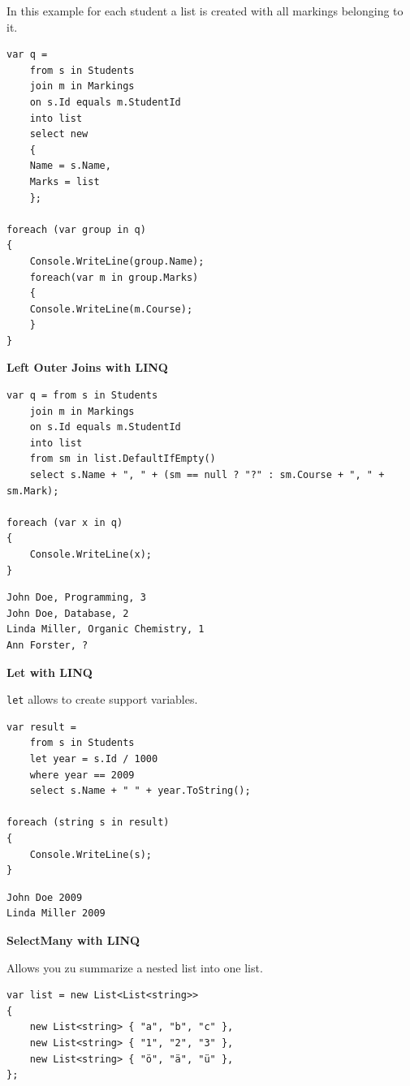 \documentclass[11pt,twoside,landscape]{article}
\begin{document}
\begin{multicols}{3}
In this example for each student a list is created with all markings belonging to it.
\lstset{language=csharp,label= ,caption= ,captionpos=b,numbers=none}
\begin{lstlisting}
var q =
    from s in Students
    join m in Markings
    on s.Id equals m.StudentId
    into list
    select new
    {
	Name = s.Name,
	Marks = list
    };

foreach (var group in q)
{
    Console.WriteLine(group.Name);
    foreach(var m in group.Marks)
    {
	Console.WriteLine(m.Course);
    }
}
\end{lstlisting}

\textbf{Left Outer Joins with LINQ}

\lstset{language=csharp,label= ,caption= ,captionpos=b,numbers=none}
\begin{lstlisting}
var q = from s in Students
    join m in Markings
    on s.Id equals m.StudentId
    into list
    from sm in list.DefaultIfEmpty()
    select s.Name + ", " + (sm == null ? "?" : sm.Course + ", " + sm.Mark);

foreach (var x in q)
{
    Console.WriteLine(x);
}
\end{lstlisting}
\begin{verbatim}
John Doe, Programming, 3
John Doe, Database, 2
Linda Miller, Organic Chemistry, 1
Ann Forster, ?
\end{verbatim}

\textbf{Let with LINQ}

\texttt{let} allows to create support variables.

\lstset{language=csharp,label= ,caption= ,captionpos=b,numbers=none}
\begin{lstlisting}
var result =
    from s in Students
    let year = s.Id / 1000
    where year == 2009
    select s.Name + " " + year.ToString();

foreach (string s in result)
{
    Console.WriteLine(s);
}
\end{lstlisting}

\begin{verbatim}
John Doe 2009
Linda Miller 2009
\end{verbatim}

\textbf{SelectMany with LINQ}

Allows you zu summarize a nested list into one list.

\lstset{language=csharp,label= ,caption= ,captionpos=b,numbers=none}
\begin{lstlisting}
var list = new List<List<string>>
{
    new List<string> { "a", "b", "c" },
    new List<string> { "1", "2", "3" },
    new List<string> { "ö", "ä", "ü" },
};


\end{lstlisting}
\end{multicols}
\end{document}
